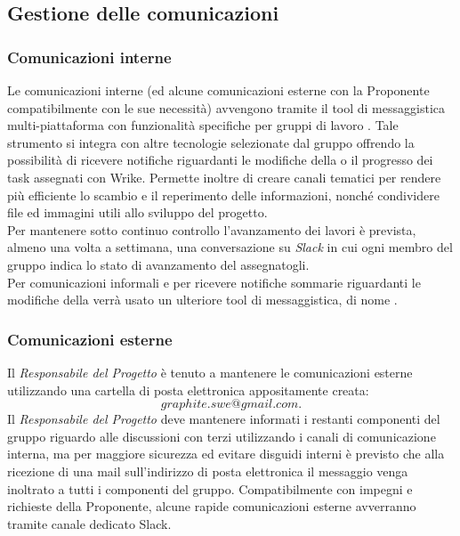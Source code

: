 \documentclass[../NormediProgetto.tex]{subfiles}
\begin{document}
	\subsection{Gestione delle comunicazioni}
	
	\subsubsection{Comunicazioni interne}
	
	Le comunicazioni interne (ed alcune comunicazioni esterne con la Proponente compatibilmente con le sue necessità) avvengono tramite il tool di messaggistica multi-piattaforma con funzionalità specifiche per gruppi di lavoro . Tale strumento si integra con altre tecnologie selezionate dal gruppo offrendo la possibilità di ricevere notifiche riguardanti le modifiche della   o il progresso dei task assegnati con Wrike. Permette inoltre di creare canali tematici per rendere più efficiente lo scambio e il reperimento delle informazioni, nonché condividere file ed immagini utili allo sviluppo del progetto.
	\\ \noindent Per mantenere sotto continuo controllo l'avanzamento dei lavori è prevista, almeno una volta a settimana, una conversazione su \textit{Slack} in cui ogni membro del gruppo indica lo stato di avanzamento del  assegnatogli.
	\\ \noindent Per comunicazioni informali e per ricevere notifiche sommarie riguardanti le modifiche della   verrà usato un ulteriore tool di messaggistica, di nome .
	
	\subsubsection{Comunicazioni esterne}
	
	Il \textit{Responsabile del Progetto} è tenuto a mantenere le comunicazioni esterne utilizzando una cartella di posta elettronica appositamente creata:
	\[graphite.swe@gmail.com.\]
	Il \textit{Responsabile del Progetto} deve mantenere informati i restanti componenti del gruppo riguardo alle discussioni con terzi utilizzando i canali di comunicazione interna, ma per maggiore sicurezza ed evitare disguidi interni è previsto che alla ricezione di una mail sull'indirizzo di posta elettronica il messaggio venga inoltrato a tutti i componenti del gruppo.
	Compatibilmente con impegni e richieste della Proponente, alcune rapide comunicazioni esterne avverranno tramite canale dedicato Slack.
	
\end{document}
